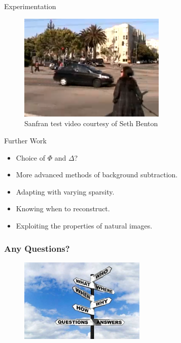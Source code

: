 \documentclass{beamer}
\begin{document}
      \begin{frame}{Experimentation}
        \begin{figure}
          \centering
          \includegraphics[width=7cm]{trafficvideo}
\caption{Sanfran test video courtesy of Seth Benton}
        \end{figure}
      \end{frame}
      
      \begin{frame}{Further Work}
        \begin{itemize}
        \item Choice of $\Phi$ and $\Delta$? 
\item More advanced methods of background subtraction.
\item Adapting with varying sparsity. 
\item Knowing when to reconstruct.
\item Exploiting the properties of natural images. 
        \end{itemize}
      \end{frame}





  \begin{frame}
    \frametitle{Any Questions?}
      \begin{figure}[h]
  \centering
  \includegraphics[height=4cm]{questions.jpg}
 \end{figure} 
  \end{frame}

%    

 
\end{document}
